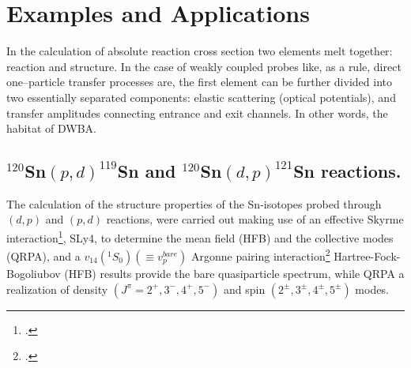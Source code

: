 \section{Examples and Applications}\label{C6S2}
  In the calculation of absolute reaction cross section two elements melt together: reaction and structure.
  In the case of weakly coupled probes like, as a rule, direct one--particle transfer processes are, the first element can be further divided into two essentially separated components: elastic scattering (optical potentials), and transfer amplitudes connecting entrance and exit channels. In other words, the habitat of DWBA.
    \subsection{$^{120}$Sn$(p,d)^{119}$Sn and $^{120}$Sn$(d,p)^{121}$Sn reactions.}\label{C6S2.1}
  The calculation of the structure properties of the Sn-isotopes probed through $(d,p)$ and $(p,d)$ reactions, were carried out making use of an effective Skyrme interaction\footnote{\cite{Chabanat:97}.}, SLy4, to determine the mean field (HFB) and the collective modes (QRPA), and a $v_{14}(^1S_0)(\equiv v_p^{bare})$ Argonne pairing interaction\footnote{\cite{Wiringa:84}.} Hartree-Fock-Bogoliubov (HFB) results provide the bare quasiparticle spectrum, while QRPA a realization of density $(J^\pi=2^+,3^-,4^+,5^-)$ and spin $(2^\pm,3^\pm,4^\pm,5^\pm)$ modes.
  
